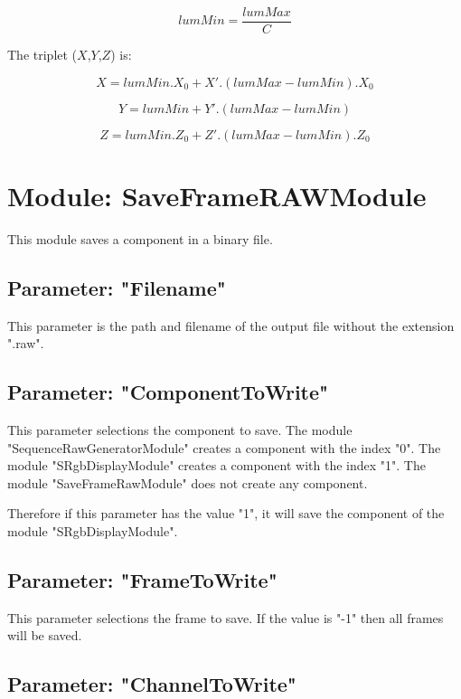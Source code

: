 \begin{displaymath}
	lumMin = \frac{lumMax}{C}
\end{displaymath}

The triplet ($X$,$Y$,$Z$) is:

\begin{displaymath}
	X = lumMin.X_0 + X'.(lumMax-lumMin).X_0
\end{displaymath}

\begin{displaymath}
	Y = lumMin + Y'.(lumMax-lumMin)
\end{displaymath}

\begin{displaymath}
	Z = lumMin.Z_0 + Z'.(lumMax-lumMin).Z_0
\end{displaymath}

\section{Module: SaveFrameRAWModule}

This module saves a component in a binary file.

\subsection{Parameter: "Filename"}

This parameter is the path and filename of the output file without the extension ".raw".

\subsection{Parameter: "ComponentToWrite"}

This parameter selections the component to save. The module "SequenceRawGeneratorModule" creates a component with the index "0". The module "SRgbDisplayModule" creates a component with the index "1". The module "SaveFrameRawModule" does not create any component.

Therefore if this parameter has the value "1", it will save the component of the module "SRgbDisplayModule".

\subsection{Parameter: "FrameToWrite"}
This parameter selections the frame to save. If the value is "-1" then all frames will be saved.

\subsection{Parameter: "ChannelToWrite"}

